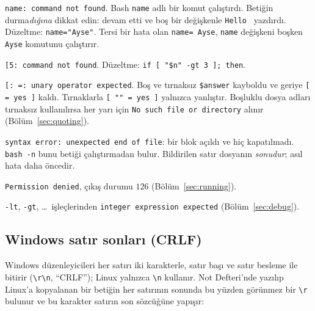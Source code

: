 \documentclass[11pt,a4paper]{article}
\newcommand{\cmd}[1]{\texttt{#1}}
\begin{document}


\begin{description}[leftmargin=0pt,itemsep=0.3em]
  \item[\texttt{=} çevresinde boşluk] \texttt{name: command not found}. Bash \texttt{name} adlı bir komut çalıştırdı. Betiğin durma\emph{dığına} dikkat edin: devam etti ve boş bir değişkenle \texttt{Hello } yazdırdı. Düzeltme: \texttt{name="Ayse"}. Tersi bir hata olan \texttt{name= Ayse}, \texttt{name} değişkeni boşken \texttt{Ayse} komutunu çalıştırır.
  \item[\texttt{[ ]} içinde boşluk yok] \texttt{[5: command not found}. Düzeltme: \texttt{if [ "\$n" -gt 3 ]; then}.
  \item[Eksik tırnaklar] \texttt{[: =: unary operator expected}. Boş ve tırnaksız \texttt{\$answer} kayboldu ve geriye \texttt{[ = yes ]} kaldı. Tırnaklarla \texttt{[ "" = yes ]} yalnızca yanlıştır. Boşluklu dosya adları tırnaksız kullanılırsa her yarı için \texttt{No such file or directory} alınır (Bölüm~\ref{sec:quoting}).
  \item[Eksik \texttt{fi}, \texttt{done} ya da tırnak] \texttt{syntax error: unexpected end of file}: bir blok açıldı ve hiç kapatılmadı. \cmd{bash -n} bunu betiği çalıştırmadan bulur. Bildirilen satır dosyanın \emph{sonudur}; asıl hata daha öncedir.
  \item[Eksik \texttt{chmod +x}] \texttt{Permission denied}, çıkış durumu $126$ (Bölüm~\ref{sec:running}).
  \item[Sayı değil] \texttt{-lt}, \texttt{-gt}, \ldots\ işleçlerinden \texttt{integer expression expected} (Bölüm~\ref{sec:debug}).
\end{description}

\subsection{Windows satır sonları (CRLF)}

Windows düzenleyicileri her satırı iki karakterle, satır başı ve satır besleme ile bitirir (\texttt{\textbackslash r\textbackslash n}, “CRLF”); Linux yalnızca \texttt{\textbackslash n} kullanır. Not Defteri'nde yazılıp Linux'a kopyalanan bir betiğin her satırının sonunda bu yüzden görünmez bir \texttt{\textbackslash r} bulunur ve bu karakter satırın son sözcüğüne yapışır:


\end{document}
